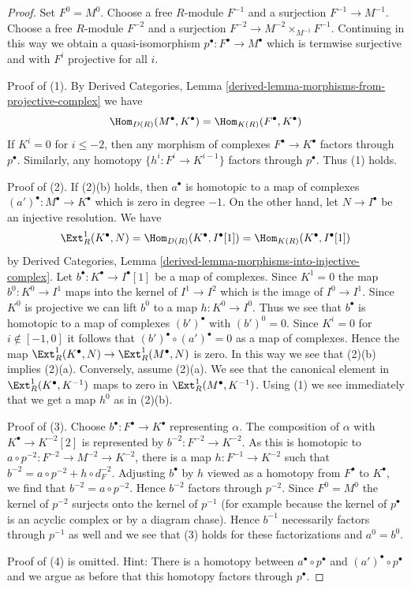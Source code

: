 \begin{proof}
Set $F^0 = M^0$.
Choose a free $R$-module $F^{-1}$ and a surjection $F^{-1} \to M^{-1}$.
Choose a free $R$-module $F^{-2}$ and a surjection
$F^{-2} \to M^{-2} \times_{M^{-1}} F^{-1}$. Continuing in this
way we obtain a quasi-isomorphism $p^\bullet : F^\bullet \to M^\bullet$
which is termwise surjective and with $F^i$ projective for all $i$.

\medskip\noindent
Proof of (1). By
Derived Categories, Lemma \ref{derived-lemma-morphisms-from-projective-complex}
we have
$$
\Hom_{D(R)}(M^\bullet, K^\bullet) = \Hom_{K(R)}(F^\bullet, K^\bullet)
$$
If $K^i = 0$ for $i \leq -2$, then any morphism of complexes
$F^\bullet \to K^\bullet$ factors through $p^\bullet$. Similarly, any
homotopy $\{h^i : F^i \to K^{i - 1}\}$ factors through $p^\bullet$.
Thus (1) holds.

\medskip\noindent
Proof of (2). If (2)(b) holds, then $a^\bullet$ is homotopic to a map
of complexes $(a')^\bullet : M^\bullet \to K^\bullet$
which is zero in degree $-1$.
On the other hand, let $N \to I^\bullet$ be an injective resolution.
We have
$$
\Ext^1_R(K^\bullet, N) = \Hom_{D(R)}(K^\bullet, I^\bullet[1]) =
\Hom_{K(R)}(K^\bullet, I^\bullet[1])
$$
by Derived Categories, Lemma
\ref{derived-lemma-morphisms-into-injective-complex}.
Let $b^\bullet : K^\bullet \to I^\bullet[1]$ be a map of complexes.
Since $K^1 = 0$ the map $b^0 : K^0 \to I^1$ maps into the kernel of
$I^1 \to I^2$ which is the image of $I^0 \to I^1$. Since $K^0$ is projective
we can lift $b^0$ to a map $h : K^0 \to I^0$. Thus we see that $b^\bullet$
is homotopic to a map of complexes $(b')^\bullet$ with $(b')^0 = 0$. Since
$K^i = 0$ for $i \not \in [-1, 0]$ it follows that
$(b')^\bullet \circ (a')^\bullet = 0$ as a map of complexes.
Hence the map $\Ext^1_R(K^\bullet, N) \to
\Ext^1_R(M^\bullet, N)$ is zero. In this way we see that (2)(b)
implies (2)(a). Conversely, assume (2)(a). We see that the
canonical element in $\Ext^1_R(K^\bullet, K^{-1})$ maps to
zero in $\Ext^1_R(M^\bullet, K^{-1})$. Using (1) we
see immediately that we get a map $h^0$ as in (2)(b).

\medskip\noindent
Proof of (3). Choose $b^\bullet : F^\bullet \to K^\bullet$ representing
$\alpha$. The composition of $\alpha$ with $K^\bullet \to K^{-2}[2]$ is
represented by $b^{-2} : F^{-2} \to K^{-2}$. As this is homotopic to
$a \circ p^{-2} : F^{-2} \to M^{-2} \to K^{-2}$, there is a map
$h : F^{-1} \to K^{-2}$ such that $b^{-2} = a \circ p^{-2} + h \circ d_F^{-2}$.
Adjusting $b^\bullet$ by $h$ viewed as a homotopy from $F^\bullet$
to $K^\bullet$, we find that $b^{-2} = a \circ p^{-2}$. Hence $b^{-2}$
factors through $p^{-2}$. Since $F^0 = M^0$ the kernel of $p^{-2}$
surjects onto the kernel of $p^{-1}$ (for example because the kernel
of $p^\bullet$ is an acyclic complex or by a diagram chase). Hence $b^{-1}$
necessarily factors through $p^{-1}$ as well and we see that (3)
holds for these factorizations and $a^0 = b^0$.

\medskip\noindent
Proof of (4) is omitted. Hint: There is a homotopy between
$a^\bullet \circ p^\bullet$ and $(a')^\bullet \circ p^\bullet$
and we argue as before that this homotopy factors through $p^\bullet$.
\end{proof}


